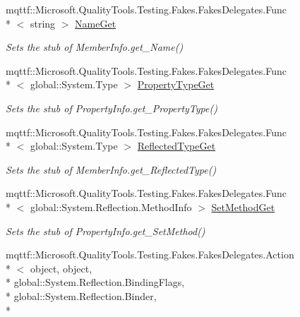 \begin{DoxyCompactItemize}
mqttf\-::\-Microsoft.\-Quality\-Tools.\-Testing.\-Fakes.\-Fakes\-Delegates.\-Func\\*
$<$ string $>$ \hyperlink{class_system_1_1_reflection_1_1_fakes_1_1_stub_property_info_a21b57274dc84cf0fb89e3a8599c774bf}{Name\-Get}
\begin{DoxyCompactList}\small\item\em Sets the stub of Member\-Info.\-get\-\_\-\-Name()\end{DoxyCompactList}\item 
mqttf\-::\-Microsoft.\-Quality\-Tools.\-Testing.\-Fakes.\-Fakes\-Delegates.\-Func\\*
$<$ global\-::\-System.\-Type $>$ \hyperlink{class_system_1_1_reflection_1_1_fakes_1_1_stub_property_info_a03773af771c181a60e6c404f3e4e75dc}{Property\-Type\-Get}
\begin{DoxyCompactList}\small\item\em Sets the stub of Property\-Info.\-get\-\_\-\-Property\-Type()\end{DoxyCompactList}\item 
mqttf\-::\-Microsoft.\-Quality\-Tools.\-Testing.\-Fakes.\-Fakes\-Delegates.\-Func\\*
$<$ global\-::\-System.\-Type $>$ \hyperlink{class_system_1_1_reflection_1_1_fakes_1_1_stub_property_info_ad5e38e90ff80c0b106bbf2f027450e43}{Reflected\-Type\-Get}
\begin{DoxyCompactList}\small\item\em Sets the stub of Member\-Info.\-get\-\_\-\-Reflected\-Type()\end{DoxyCompactList}\item 
mqttf\-::\-Microsoft.\-Quality\-Tools.\-Testing.\-Fakes.\-Fakes\-Delegates.\-Func\\*
$<$ global\-::\-System.\-Reflection.\-Method\-Info $>$ \hyperlink{class_system_1_1_reflection_1_1_fakes_1_1_stub_property_info_a0ef8f108d027673911448f05882cb899}{Set\-Method\-Get}
\begin{DoxyCompactList}\small\item\em Sets the stub of Property\-Info.\-get\-\_\-\-Set\-Method()\end{DoxyCompactList}\item 
mqttf\-::\-Microsoft.\-Quality\-Tools.\-Testing.\-Fakes.\-Fakes\-Delegates.\-Action\\*
$<$ object, object, \\*
global\-::\-System.\-Reflection.\-Binding\-Flags, \\*
global\-::\-System.\-Reflection.\-Binder, \\*

\end{DoxyCompactItemize}
